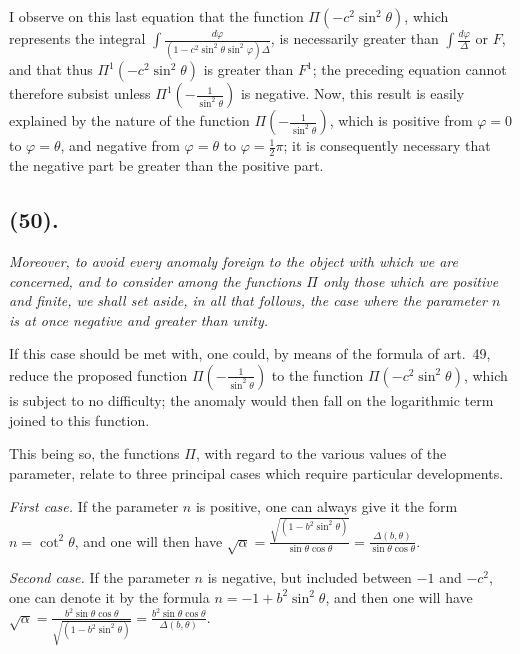 \documentclass{article}
\begin{document}
I observe on this last equation that the function $\Pi(-c^{2}\sin^{2}\theta)$, which represents the integral $\displaystyle\int\frac{d\varphi}{(1-c^{2}\sin^{2}\theta\sin^{2}\varphi)\Delta}$, is necessarily greater than $\displaystyle\int\frac{d\varphi}{\Delta}$ or $F$, and that thus $\Pi^{1}(-c^{2}\sin^{2}\theta)$ is greater than $F^{1}$; the preceding equation cannot therefore subsist unless $\Pi^{1}\left(-\frac{1}{\sin^{2}\theta}\right)$ is negative. Now, this result is easily explained by the nature of the function $\Pi\left(-\frac{1}{\sin^{2}\theta}\right)$, which is positive from $\varphi=0$ to $\varphi=\theta$, and negative from $\varphi=\theta$ to $\varphi=\frac{1}{2}\pi$; it is consequently necessary that the negative part be greater than the positive part.

\subsection*{(50).}

\emph{Moreover, to avoid every anomaly foreign to the object with which we are concerned, and to consider among the functions $\Pi$ only those which are positive and finite, we shall set aside, in all that follows, the case where the parameter $n$ is at once negative and greater than unity.}

If this case should be met with, one could, by means of the formula of art.\ 49, reduce the proposed function $\Pi\left(-\frac{1}{\sin^{2}\theta}\right)$ to the function $\Pi(-c^{2}\sin^{2}\theta)$, which is subject to no difficulty; the anomaly would then fall on the logarithmic term joined to this function.

This being so, the functions $\Pi$, with regard to the various values of the parameter, relate to three principal cases which require particular developments.

\emph{First case.} If the parameter $n$ is positive, one can always give it the form $n=\cot^{2}\theta$, and one will then have $\sqrt{\alpha}=\frac{\sqrt{(1-b^{2}\sin^{2}\theta)}}{\sin\theta\cos\theta}=\frac{\Delta(b,\theta)}{\sin\theta\cos\theta}$.

\emph{Second case.} If the parameter $n$ is negative, but included between $-1$ and $-c^{2}$, one can denote it by the formula $n=-1+b^{2}\sin^{2}\theta$, and then one will have $\sqrt{\alpha}=\frac{b^{2}\sin\theta\cos\theta}{\sqrt{(1-b^{2}\sin^{2}\theta)}}=\frac{b^{2}\sin\theta\cos\theta}{\Delta(b,\theta)}$.

\end{document}
